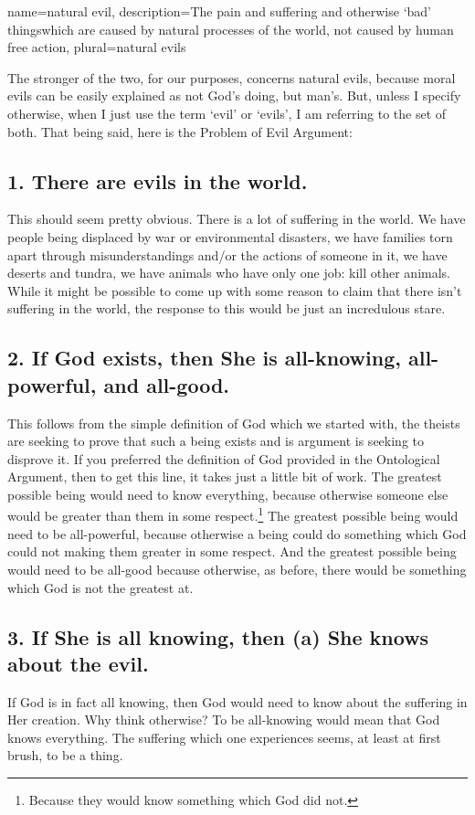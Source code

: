 {
name=natural evil,
description={The pain and suffering and otherwise `bad' thingswhich are caused by natural processes of the world, not caused by human free action},
plural=natural evils
}


The stronger of the two, for our purposes, concerns natural evils, because moral evils can be easily explained as not God's doing, but man's. But, unless I specify otherwise, when I just use the term ‘evil’ or ‘evils’, I am referring to the set of both. That being said, here is the Problem of Evil Argument:

\subsection{1. There are evils in the world.}
This should seem pretty obvious. There is a lot of suffering in the world. We have people being displaced by war or environmental disasters, we have families torn apart through misunderstandings and/or the actions of someone in it, we have deserts and tundra, we have animals who have only one job: kill other animals. While it might be possible to come up with some reason to claim that there isn't suffering in the world, the response to this would be just an incredulous stare. 
\subsection{2. If God exists, then She is all-knowing, all-powerful, and all-good.}
This follows from the simple definition of God which we started with, the theists are seeking to prove that such a being exists and is argument is seeking to disprove it. If you preferred the definition of God provided in the Ontological Argument, then to get this line, it takes just a little bit of work. The greatest possible being would need to know everything, because otherwise someone else would be greater than them in some respect.\footnote{Because they would know something which God did not.} The greatest possible being would need to be all-powerful, because otherwise a being could do something which God could not making them greater in some respect. And the greatest possible being would need to be all-good because otherwise, as before, there would be something which God is not the greatest at. 
\subsection{3. If She is all knowing, then (a) She knows about the evil.}
If God is in fact all knowing, then God would need to know about the suffering in Her creation. Why think otherwise? To be all-knowing would mean that God knows everything. The suffering which one experiences seems, at least at first brush, to be a thing. 
